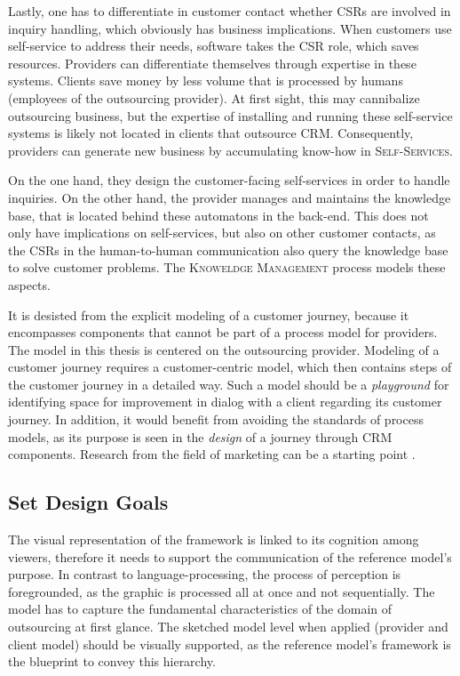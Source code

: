 	Lastly, one has to differentiate in customer contact whether \acrshort{CSR}s are involved in inquiry handling, which obviously has business implications. When customers use self-service to address their needs, software takes the \acrshort{CSR} role, which saves resources. Providers can differentiate themselves through expertise in these systems. Clients save money by less volume that is processed by humans (employees of the outsourcing provider). At first sight, this may cannibalize outsourcing business, but the expertise of installing and running these self-service systems is likely not located in clients that outsource \acrshort{CRM}. Consequently, providers can generate new business by accumulating know-how in \textsc{Self-Services}. 
	
	On the one hand, they design the customer-facing self-services in order to handle inquiries. On the other hand, the provider manages and maintains the knowledge base, that is located behind these automatons in the back-end. This does not only have implications on self-services, but also on other customer contacts, as the \acrshort{CSR}s in the human-to-human communication also query the knowledge base to solve customer problems. The \textsc{Knoweldge Management} process models these aspects.
	
	It is desisted from the explicit modeling of a customer journey, because it encompasses components that cannot be part of a process model for providers. The model in this thesis is centered on the outsourcing provider. Modeling of a customer journey requires a customer-centric model, which then contains steps of the customer journey in a detailed way. Such a model should be a \textit{playground} for identifying space for improvement in dialog with a client regarding its customer journey. In addition, it would benefit from avoiding the standards of process models, as its purpose is seen in the \textit{design} of a journey through \acrshort{CRM} components. Research from the field of marketing can be a starting point \citep{Lemon_2016, Frow_2007}. 
	
	\subsection{Set Design Goals}
	
	The visual representation of the framework is linked to its cognition among viewers, therefore it needs to support the communication of the reference model's purpose. In contrast to language-processing, the process of perception is foregrounded, as the graphic is processed all at once and not sequentially. The model has to capture the fundamental characteristics of the domain of outsourcing at first glance. The sketched model level when applied (provider and client model) should be visually supported, as the reference model's framework is the blueprint to convey this hierarchy. 
	
